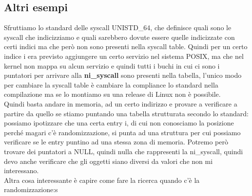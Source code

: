 \documentclass[12pt, oneside]{extbook}
\begin{document}
\subsection{Altri esempi}
Sfruttiamo lo standard delle syscall UNISTD\_64, che definisce quali sono le syscall che indicizziamo e quali sarebbero dovute essere quelle indicizzate con certi indici ma che però non sono presenti nella syscall table. Quindi per un certo indice i era previsto aggiungere un certo servizio nel sistema POSIX, ma che nel kernel non mappa su alcun servizio e quindi tutti i buchi in cui ci sono i puntatori per arrivare alla \textbf{ni\_syscall} sono presenti nella tabella, l'unico modo per cambiare la syscall table è cambiare la compliance lo standard nella compilazione ma se lo montiamo su una release di Linux non è possibile. \\ Quindi basta andare in memoria, ad un certo indirizzo e provare a verificare a partire da quello se stiamo puntando una tabella strutturata secondo lo standard: possiamo ipotizzare che una certa entry i, di cui non conosciamo la posizione perché magari c'è randomizzazione, si punta ad una struttura per cui possiamo verificare se le entry puntino ad una stessa zona di memoria. Potremo però trovare dei puntatori a NULL, quindi nulla che rappresenti la ni\_syscall, quindi devo anche verificare che gli oggetti siano diversi da valori che non mi interessano.\\ Altra cosa interessante è capire come fare la ricerca quando c'è la randomizzazione:s
\end{document}

